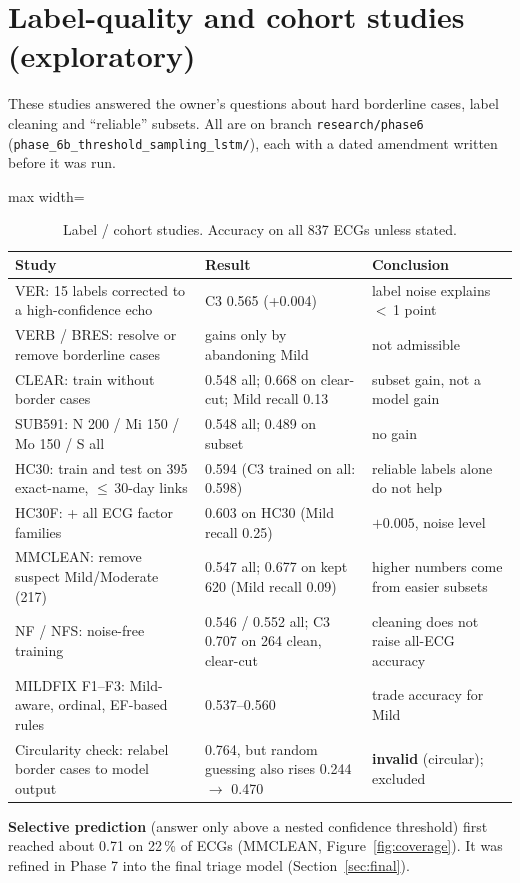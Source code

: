 \section{Label-quality and cohort studies (exploratory)}\label{sec:labels}
These studies answered the owner's questions about hard borderline cases, label cleaning and ``reliable'' subsets.
All are on branch \texttt{research/phase6} (\texttt{phase\_6b\_threshold\_sampling\_lstm/}), each with a dated
amendment written before it was run.

\begin{table}[H]\centering\small
\caption{Label / cohort studies. Accuracy on all 837 ECGs unless stated.}\label{tab:labels}
\begin{adjustbox}{max width=\linewidth}
\begin{tabular}{p{4.4cm}p{4.6cm}p{5.4cm}}\toprule
Study & Result & Conclusion \\\midrule
VER: 15 labels corrected to a high-confidence echo & C3 0.565 (+0.004) & label noise explains $<$\,1 point \\
VERB / BRES: resolve or remove borderline cases & gains only by abandoning Mild & not admissible \\
CLEAR: train without border cases & 0.548 all; 0.668 on clear-cut; Mild recall 0.13 & subset gain, not a model gain \\
SUB591: N 200 / Mi 150 / Mo 150 / S all & 0.548 all; 0.489 on subset & no gain \\
HC30: train and test on 395 exact-name, $\le$\,30-day links & 0.594 (C3 trained on all: 0.598) & reliable labels alone do not help \\
HC30F: + all ECG factor families & 0.603 on HC30 (Mild recall 0.25) & $+0.005$, noise level \\
MMCLEAN: remove suspect Mild/Moderate (217) & 0.547 all; 0.677 on kept 620 (Mild recall 0.09) & higher numbers come from easier subsets \\
NF / NFS: noise-free training & 0.546 / 0.552 all; C3 0.707 on 264 clean, clear-cut & cleaning does not raise all-ECG accuracy \\
MILDFIX F1--F3: Mild-aware, ordinal, EF-based rules & 0.537--0.560 & trade accuracy for Mild \\
Circularity check: relabel border cases to model output & 0.764, but random guessing also rises 0.244 $\to$ 0.470 & \textbf{invalid} (circular); excluded \\\bottomrule
\end{tabular}
\end{adjustbox}
\end{table}
\textbf{Selective prediction} (answer only above a nested confidence threshold) first reached about 0.71 on 22\,\% of
ECGs (MMCLEAN, Figure~\ref{fig:coverage}). It was refined in Phase 7 into the final triage model (Section~\ref{sec:final}).

